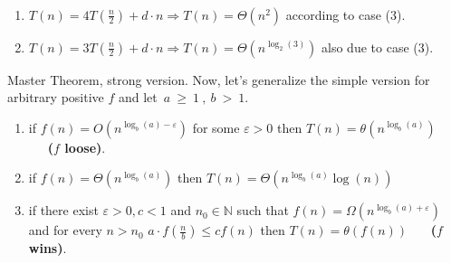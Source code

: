 \begin{example}\
  \begin{enumerate}
    \item \( T(n)  =4T(\frac{n}{2})+d\cdot n \Rightarrow
      T(n) = \Theta(n^2)\) according to case (3).
    \item \(T(n)  = 3T(\frac{n}{2}) + d\cdot n \Rightarrow T(n) = \Theta ( n^{\log_{2}(3)})\)
      also due to case (3).
  \end{enumerate}
\end{example}
\begin{defbox}{Master Theorem, strong version.} 
Now, let's generalize the simple version for arbitrary positive \(f\) and let~\(a~\ge~1~,~b~>~1\). 

\newcommand{\logab}{\log_{b} \left(a\right)}

\begin{enumerate}
    \item if  \(f\left(n\right) = O \left( n^{\logab - \varepsilon }\right)\) for some \( \varepsilon > 0 \) then \( T\left(n\right) = \theta \left( n^{\logab} \right) \) \ \ \ \textbf{(\(f\) loose)}.
    
    \item if  \(f\left(n\right) = \Theta \left( n^{\logab} \right) \) then \( T\left(n\right) = \Theta \left( n^{\logab}  \log\left(n\right)\right) \)
    
    \item if there exist \(\varepsilon >0 ,c<1\) and \(n_0 \in \mathbb{N} \) such that  \(f\left(n\right) = \Omega \left( n^{\logab + \varepsilon }\right)\) and for every \( n > n_0 \) \(a \cdot f\left( \frac{n}{b} \right) \le c f\left(n\right)\)  then \( T\left(n\right) = \theta \left( f\left(n\right) \right) \) \ \ \ \textbf{(\(f\) wins)}.
    
\end{enumerate}
\end{defbox}
\newcommand{\TT}[2]{#1 T\left(\frac{n}{#2}\right)}

